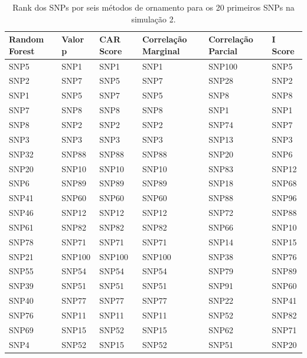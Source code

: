 \begin{table}[ht]
\centering
\begin{tabular}{llllll}
  \hline
Random Forest & Valor p & CAR Score & Correlação Marginal & Correlação Parcial & I Score \\ 
  \hline
SNP5 & SNP1 & SNP1 & SNP1 & SNP100 & SNP5 \\ 
  SNP2 & SNP7 & SNP5 & SNP7 & SNP28 & SNP2 \\ 
  SNP1 & SNP5 & SNP7 & SNP5 & SNP8 & SNP8 \\ 
  SNP7 & SNP8 & SNP8 & SNP8 & SNP1 & SNP1 \\ 
  SNP8 & SNP2 & SNP2 & SNP2 & SNP74 & SNP7 \\ 
  SNP3 & SNP3 & SNP3 & SNP3 & SNP13 & SNP3 \\ 
  SNP32 & SNP88 & SNP88 & SNP88 & SNP20 & SNP6 \\ 
  SNP20 & SNP10 & SNP10 & SNP10 & SNP83 & SNP12 \\ 
  SNP6 & SNP89 & SNP89 & SNP89 & SNP18 & SNP68 \\ 
  SNP41 & SNP60 & SNP60 & SNP60 & SNP88 & SNP96 \\ 
  SNP46 & SNP12 & SNP12 & SNP12 & SNP72 & SNP88 \\ 
  SNP61 & SNP82 & SNP82 & SNP82 & SNP66 & SNP10 \\ 
  SNP78 & SNP71 & SNP71 & SNP71 & SNP14 & SNP15 \\ 
  SNP21 & SNP100 & SNP100 & SNP100 & SNP38 & SNP76 \\ 
  SNP55 & SNP54 & SNP54 & SNP54 & SNP79 & SNP89 \\ 
  SNP39 & SNP51 & SNP51 & SNP51 & SNP91 & SNP60 \\ 
  SNP40 & SNP77 & SNP77 & SNP77 & SNP22 & SNP41 \\ 
  SNP76 & SNP11 & SNP11 & SNP11 & SNP52 & SNP82 \\ 
  SNP69 & SNP15 & SNP52 & SNP15 & SNP62 & SNP71 \\ 
  SNP4 & SNP52 & SNP15 & SNP52 & SNP51 & SNP20 \\ 
   \hline
\end{tabular}
\caption{Rank dos SNPs por seis métodos de ornamento para os 20 primeiros SNPs na simulação 2.} 
\label{tab:ranks}
\end{table}
